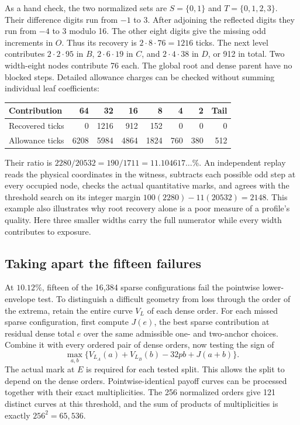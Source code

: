 \documentclass[12pt,letterpaper]{article}
\begin{document}
As a hand check, the two normalized sets are \(S=\{0,1\}\) and \(T=\{0,1,2,3\}\). Their difference digits run from \(-1\) to 3. After adjoining the reflected digits they run from \(-4\) to 3 modulo 16. The other eight digits give the missing odd increments in \(O\). Thus its recovery is \(2\cdot8\cdot76=1216\) ticks. The next level contributes \(2\cdot2\cdot95\) in \(B\), \(2\cdot6\cdot19\) in \(C\), and \(2\cdot4\cdot38\) in \(D\), or 912 in total. Two width-eight nodes contribute 76 each. The global root and dense parent have no blocked steps. Detailed allowance charges can be checked without summing individual leaf coefficients:
\begin{center}
\begin{tabular}{@{}lrrrrrrr@{}}
\toprule
Contribution & 64 & 32 & 16 & 8 & 4 & 2 & Tail\\
\midrule
Recovered ticks & 0 & 1216 & 912 & 152 & 0 & 0 & 0\\
Allowance ticks & 6208 & 5984 & 4864 & 1824 & 760 & 380 & 512\\
\bottomrule
\end{tabular}
\end{center}
Their ratio is \(2280/20532=190/1711=11.104617\ldots\%\). An independent replay reads the physical coordinates in the witness, subtracts each possible odd step at every occupied node, checks the actual quantitative marks, and agrees with the threshold search on its integer margin \(100(2280)-11(20532)=2148\). This example also illustrates why root recovery alone is a poor measure of a profile's quality. Here three smaller widths carry the full numerator while every width contributes to exposure.

\subsection{Taking apart the fifteen failures}

At \(10.12\%\), fifteen of the 16,384 sparse configurations fail the pointwise lower-envelope test. To distinguish a difficult geometry from loss through the order of the extrema, retain the entire curve \(V_L\) of each dense order. For each missed sparse configuration, first compute \(J(e)\), the best sparse contribution at residual dense total \(e\) over the same admissible one- and two-anchor choices. Combine it with every ordered pair of dense orders, now testing the sign of
\[
 \max_{a,b}\{V_{L_A}(a)+V_{L_B}(b)-32pb+J(a+b)\}.
\]
The actual mark at \(E\) is required for each tested split. This allows the split to depend on the dense orders. Pointwise-identical payoff curves can be processed together with their exact multiplicities. The 256 normalized orders give 121 distinct curves at this threshold, and the sum of products of multiplicities is exactly \(256^2=65{,}536\).
\end{document}
